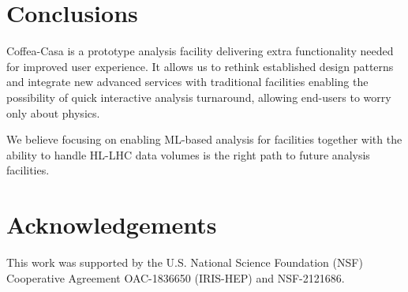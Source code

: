 \documentclass{webofc}
\begin{document}
\section{Conclusions}

Coffea-Casa is a prototype analysis facility delivering extra functionality needed for improved user experience. It allows us to rethink established design patterns and integrate new advanced services with traditional facilities enabling the possibility of quick interactive analysis turnaround, allowing end-users to worry only about physics. 

We believe focusing on enabling ML-based analysis for facilities together with the ability to handle HL-LHC data volumes is the right path to future analysis facilities.

\section{Acknowledgements}
This work was supported by the U.S. National Science Foundation (NSF) Cooperative Agreement OAC-1836650 (IRIS-HEP) and NSF-2121686.


\end{document}
